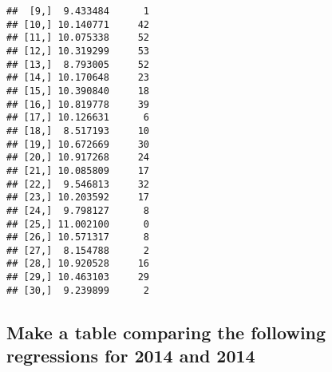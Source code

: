 \documentclass{article}\usepackage[]{graphicx}\usepackage[]{color}
\makeatletter
\newenvironment{kframe}{%
 \def\at@end@of@kframe{}%
 \ifinner\ifhmode%
  \def\at@end@of@kframe{\end{minipage}}%
  \begin{minipage}{\columnwidth}%
 \fi\fi%
 \def\FrameCommand##1{\hskip\@totalleftmargin \hskip-\fboxsep
 \colorbox{shadecolor}{##1}\hskip-\fboxsep
     \hskip-\linewidth \hskip-\@totalleftmargin \hskip\columnwidth}%
 \MakeFramed {\advance\hsize-\width
   \@totalleftmargin\z@ \linewidth\hsize
   \@setminipage}}%
 {\par\unskip\endMakeFramed%
 \at@end@of@kframe}
\newenvironment{knitrout}{}{} %
\makeatother
\begin{document}
\begin{knitrout}
\begin{kframe}
\begin{verbatim}
##  [9,]  9.433484      1
## [10,] 10.140771     42
## [11,] 10.075338     52
## [12,] 10.319299     53
## [13,]  8.793005     52
## [14,] 10.170648     23
## [15,] 10.390840     18
## [16,] 10.819778     39
## [17,] 10.126631      6
## [18,]  8.517193     10
## [19,] 10.672669     30
## [20,] 10.917268     24
## [21,] 10.085809     17
## [22,]  9.546813     32
## [23,] 10.203592     17
## [24,]  9.798127      8
## [25,] 11.002100      0
## [26,] 10.571317      8
## [27,]  8.154788      2
## [28,] 10.920528     16
## [29,] 10.463103     29
## [30,]  9.239899      2
\end{verbatim}
\end{kframe}
\end{knitrout}

\subsection{Make a table comparing the following regressions for 2014 and 2014}
\end{document}
